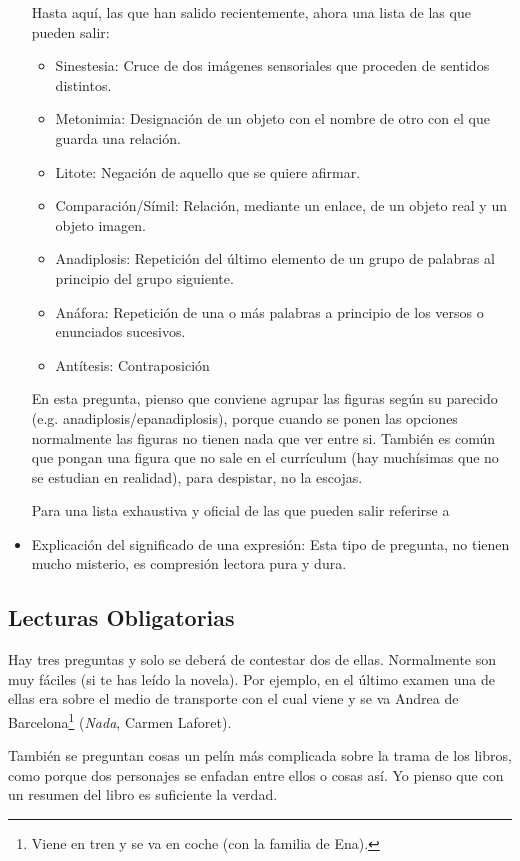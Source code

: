 \documentclass[arial,a4paper,print]{article}
\begin{document}
\begin{itemize}
Hasta aquí, las que han salido recientemente, ahora una lista de las que pueden salir:
\begin{itemize}
	\item Sinestesia: Cruce de dos imágenes sensoriales que proceden de sentidos distintos. 
	\item Metonimia: Designación de un objeto con el nombre de otro con el que guarda una relación. 
	\item Litote: Negación de aquello que se quiere afirmar. 
	\item Comparación/Símil: Relación, mediante un enlace, de un objeto real y un objeto imagen. 
	\item Anadiplosis: Repetición del último elemento de un grupo de palabras al principio del grupo siguiente.
	\item Anáfora: Repetición de una o más palabras a principio de los versos o enunciados sucesivos.
	\item Antítesis: Contraposición
\end{itemize}
En esta pregunta, pienso que conviene agrupar las figuras según su parecido (e.g. anadiplosis/epanadiplosis), porque cuando se ponen las opciones normalmente las figuras no tienen nada que ver entre si. También es común que pongan una figura que no sale en el currículum (hay muchísimas que no se estudian en realidad), para despistar, no la escojas. 

Para una lista exhaustiva y oficial de las que pueden salir referirse a  

\item Explicación del significado de una expresión: Esta tipo de pregunta, no tienen mucho misterio, es compresión lectora pura y dura. 
\end{itemize}

\subsection{Lecturas Obligatorias}
Hay tres preguntas y solo se deberá de contestar dos de ellas. Normalmente son muy fáciles (si te has leído la novela). Por ejemplo, en el último examen una de ellas era sobre el medio de transporte con el cual viene y se va Andrea de Barcelona\footnote{Viene en tren y se va en coche (con la familia de Ena).} (\textit{Nada}, Carmen Laforet). 

También se preguntan cosas un pelín más complicada sobre la trama de los libros, como porque dos personajes se enfadan entre ellos o cosas así. Yo pienso que con un resumen del libro es suficiente la verdad. 
\end{document}
